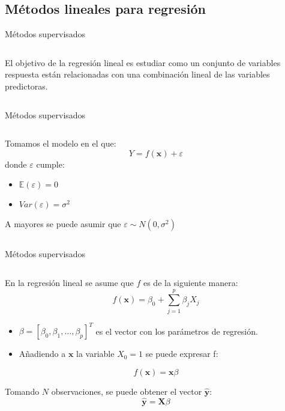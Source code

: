 \subsection{Métodos lineales para regresión}
\begin{frame}{Métodos supervisados}
\begin{columns}
\begin{column}{0.9\textwidth}
El objetivo de la regresión lineal es estudiar como un conjunto de variables respuesta están relacionadas con una combinación lineal de las variables predictoras. 
\end{column}
\end{columns}
\end{frame}

\begin{frame}{Métodos supervisados}
\begin{columns}
\begin{column}{0.9\textwidth}
Tomamos el modelo en el que: 
\begin{equation}
Y=f(\mathbf{x})+\varepsilon
\end{equation}
donde $\varepsilon$ cumple:
\begin{itemize}
\item $\mathbb{E}(\varepsilon)=0$
\item $Var(\varepsilon)=\sigma^2$
\end{itemize}
A mayores se puede asumir que $\varepsilon\sim N(0,\sigma^2)$
\end{column}
\end{columns}
\end{frame}

\begin{frame}{Métodos supervisados}
\begin{columns}
\begin{column}{0.9\textwidth}
En la regresión lineal se asume que $f$ es de la siguiente manera:
\begin{equation}
f(\mathbf{x})=\beta_0+\sum_{j=1}^p \beta_j X_j
\end{equation}
\begin{itemize}
\item $\beta=[\beta_0,\beta_1,\ldots,\beta_p]^T$ es el vector con los parámetros de regresión.
\item Añadiendo a $\mathbf{x}$ la variable $X_0=1$ se puede expresar f: 
\end{itemize}

\begin{equation}
f(\mathbf{x})=\mathbf{x}\beta
\end{equation}

Tomando $N$ observaciones, se puede obtener el vector $\mathbf{\hat{y}}$:
\begin{equation}\label{eq: predicción}
\mathbf{\hat{y}}=\mathbf{X}\beta
\end{equation}

\end{column}
\end{columns}
\end{frame}


